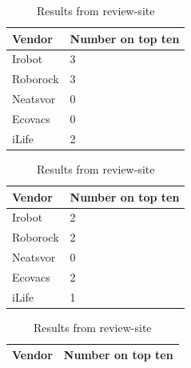 \begin{table}[H]
    \label{tab:Robotreviewsites}
    \centering
    \begin{subtable}[b]{0.45\linewidth}
        \centering
        \caption{Results from review-site \cite{robotsel11}}
        \begin{tabular}{|l|l|}
            \hline 
            \textbf{Vendor} & \textbf{Number on top ten} \\ \hline
            Irobot      & 3                 \\                   \hline
            Roborock    & 3                 \\                   \hline
            Neatsvor    & 0                 \\                   \hline
            Ecovacs     & 0                 \\                   \hline
            iLife       & 2                 \\                   \hline
        \end{tabular}
    \end{subtable}
    \hspace{0.5cm}
    \begin{subtable}[b]{0.45\linewidth}
        \centering
        \caption{Results from review-site \cite{robotsel12}}
        \begin{tabular}{|l|l|}
            \hline
            \textbf{Vendor}    & \textbf{Number on top ten} \\ \hline
            Irobot      & 2                 \\                   \hline
            Roborock    & 2                 \\                   \hline
            Neatsvor    & 0                 \\                   \hline
            Ecovacs     & 2                 \\                   \hline
            iLife       & 1                 \\                   \hline
        \end{tabular}
    \end{subtable}
    \begin{subtable}[b]{0.45\linewidth}
        \centering
        \caption{Results from review-site \cite{robotsel13}}
        \begin{tabular}{|l|l|}
            \hline
            \textbf{Vendor}    & \textbf{Number on top ten} \\ \hline

\end{tabular}
\end{subtable}
\end{table}
